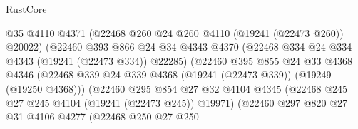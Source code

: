 \begin{lexlean}{RustCore}
\begin{coremodule}
                                      @35
                                      @4110
                                      @4371
                                      (@22468 @260 @24 @260 @4110 (@19241 (@22473 @260)) @20022)
                                      (@22460
                                        @393
                                        @866
                                        @24
                                        @34
                                        @4343
                                        @4370
                                        (@22468 @334 @24 @334 @4343 (@19241 (@22473 @334)) @22285)
                                        (@22460
                                          @395
                                          @855
                                          @24
                                          @33
                                          @4368
                                          @4346
                                          (@22468
                                            @339
                                            @24
                                            @339
                                            @4368
                                            (@19241 (@22473 @339))
                                            (@19249 (@19250 @4368)))
                                          (@22460
                                            @295
                                            @854
                                            @27
                                            @32
                                            @4104
                                            @4345
                                            (@22468
                                              @245
                                              @27
                                              @245
                                              @4104
                                              (@19241 (@22473 @245))
                                              @19971)
                                            (@22460
                                              @297
                                              @820
                                              @27
                                              @31
                                              @4106
                                              @4277
                                              (@22468
                                                @250
                                                @27
                                                @250

\end{coremodule}
\end{lexlean}
